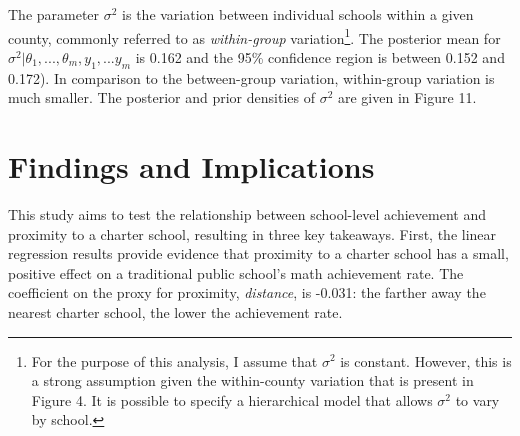 \documentclass[11pt]{article}
\begin{document}
The parameter $\sigma^2$ is the variation between individual schools within a given county, commonly referred to as \textit{within-group} variation\footnote{For the purpose of this analysis, I assume that $\sigma^2$ is constant.  However, this is a strong assumption given the within-county variation that is present in Figure 4.  It is possible to specify a hierarchical model that allows $\sigma^2$ to vary by school.}.   The posterior mean for $\sigma^2\vert\theta_1,...,\theta_m,y_1,...y_m$ is 0.162 and the 95\% confidence region is between 0.152 and 0.172).  In comparison to the between-group variation, within-group variation is much smaller.  The posterior and prior densities of $\sigma^2$ are given in  Figure 11.
\begin{figure}[H]
\hfill
{}
\hfill
{}
\hfill
\end{figure}

\section{Findings and Implications}
This study aims to test the relationship between school-level achievement and proximity to a charter school, resulting in three key takeaways.  First, the linear regression results provide evidence that proximity to a charter school has a small, positive effect on a traditional public school's math achievement rate.  The coefficient on the proxy for proximity, \textit{distance}, is -0.031: the farther away the nearest charter school, the lower the achievement rate.
\end{document}
